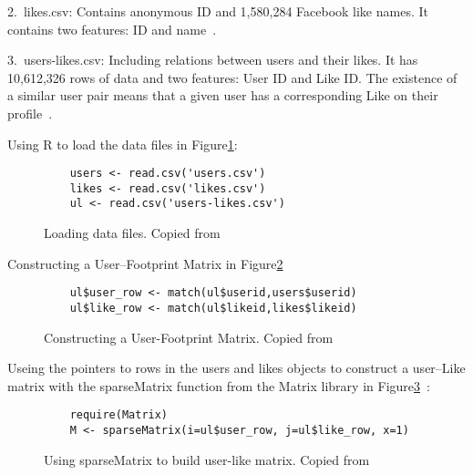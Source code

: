 2.\ likes.csv: Contains anonymous ID and 1,580,284 Facebook like 
names. It contains two features: ID and name~\cite{hid515-11}.

3.\ users-likes.csv: Including relations between users and their 
likes. It has 10,612,326 rows of data and two 
features: User ID and Like ID. The existence of a similar user pair
 means that a given user has a corresponding Like on their 
profile~\cite{hid515-11}.

Using R to load the data files in Figure\ref{F:loading}:

\begin{figure}[htb]
\begin{footnotesize}
\begin{verbatim}
    users <- read.csv('users.csv')
    likes <- read.csv('likes.csv')
    ul <- read.csv('users-likes.csv')
\end{verbatim}
\end{footnotesize}
\caption{Loading data files. Copied from~\cite{hid515-12}}
\label{F:loading}
\end{figure}

Constructing a User–Footprint Matrix in Figure\ref{F:footprintmatrix}

\begin{figure}[htb]
\begin{footnotesize}
\begin{verbatim}
    ul$user_row <- match(ul$userid,users$userid)
    ul$like_row <- match(ul$likeid,likes$likeid)
\end{verbatim}
\end{footnotesize}
\caption{Constructing a User-Footprint Matrix. 
Copied from~\cite{hid515-12}}
\label{F:footprintmatrix}
\end{figure}


Useing the pointers to rows in the users and likes objects to 
construct a user–Like matrix with the sparseMatrix 
function from the Matrix
 library in Figure\ref{F:sparseMatrix}~\cite{hid515-12}:

\begin{figure}[htb]
\begin{footnotesize}
\begin{verbatim}
    require(Matrix)
    M <- sparseMatrix(i=ul$user_row, j=ul$like_row, x=1)
\end{verbatim}
\end{footnotesize}
\caption{Using sparseMatrix to build user-like matrix. 
Copied from~\cite{hid515-12}}
\label{F:sparseMatrix}
\end{figure}


